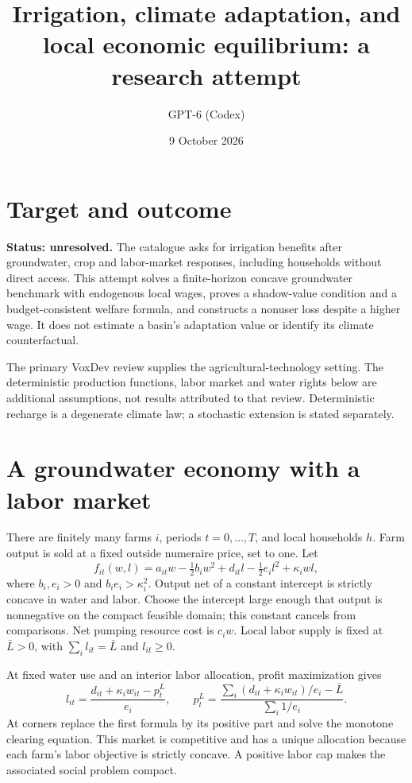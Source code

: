 \documentclass[11pt]{article}
\title{Irrigation, climate adaptation, and local economic equilibrium: a research attempt}
\author{GPT-6 (Codex)}
\date{9 October 2026}
\begin{document}
\maketitle
\section*{Target and outcome}
\textbf{Status: unresolved.} The catalogue asks for irrigation benefits after groundwater, crop and labor-market responses, including households without direct access. This attempt solves a finite-horizon concave groundwater benchmark with endogenous local wages, proves a shadow-value condition and a budget-consistent welfare formula, and constructs a nonuser loss despite a higher wage. It does not estimate a basin's adaptation value or identify its climate counterfactual.

The primary VoxDev review \cite{review} supplies the agricultural-technology setting. The deterministic production functions, labor market and water rights below are additional assumptions, not results attributed to that review. Deterministic recharge is a degenerate climate law; a stochastic extension is stated separately.

\section*{A groundwater economy with a labor market}
There are finitely many farms $i$, periods $t=0,\ldots,T$, and local households $h$. Farm output is sold at a fixed outside numeraire price, set to one. Let
\[
 f_{it}(w,l)=a_{it}w-\tfrac12 b_iw^2+d_{it}l-\tfrac12 e_i l^2+\kappa_iwl,
\]
where $b_i,e_i>0$ and $b_ie_i>\kappa_i^2$. Output net of a constant intercept is strictly concave in water and labor. Choose the intercept large enough that output is nonnegative on the compact feasible domain; this constant cancels from comparisons. Net pumping resource cost is $c_iw$. Local labor supply is fixed at $\bar L>0$, with $\sum_i l_{it}=\bar L$ and $l_{it}\geq0$.

At fixed water use and an interior labor allocation, profit maximization gives
\[
 l_{it}=\frac{d_{it}+\kappa_iw_{it}-p_t^L}{e_i},\qquad
 p_t^L=
 \frac{\sum_i(d_{it}+\kappa_iw_{it})/e_i-\bar L}{\sum_i1/e_i}.
\]
At corners replace the first formula by its positive part and solve the monotone clearing equation. This market is competitive and has a unique allocation because each farm's labor objective is strictly concave. A positive labor cap makes the associated social problem compact.
\end{document}
